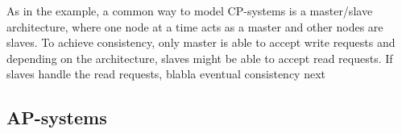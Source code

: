 As in the example, a common way to model CP-systems is a master/slave
architecture, where one node at a time acts as a master and other nodes are
slaves. To achieve consistency, only master is able to accept write requests and
depending on the architecture, slaves might be able to accept read requests. If
slaves handle the read requests, blabla eventual consistency next

\subsection{AP-systems}

